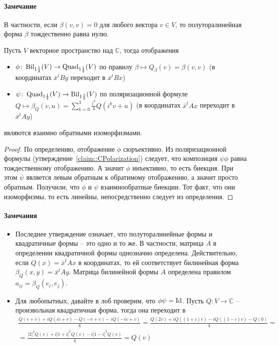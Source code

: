 \paragraph{Замечание}

В частности, если $\beta(v, v) = 0$ для любого вектора $v\in V$, то полуторалинейная форма $\beta$ тождественно равна нулю.

\begin{claim}\label{claim::CBilQuad}
Пусть $V$ векторное пространство над $\mathbb C$, тогда отображения
\begin{itemize}
\item $\phi\colon\operatorname{Bil}_{1\frac{1}{2}}(V)\to \operatorname{Quad}_{1\frac{1}{2}}(V)$ по правилу $\beta\mapsto Q_\beta(v) = \beta(v,v)$ (в координатах $\bar x^t B y$ переходит в $\bar x^t B x$)
\item $\psi\colon\operatorname{Quad}_{1\frac{1}{2}}(V)\to \operatorname{Bil}_{1\frac{1}{2}}(V)$ по поляризационной формуле $Q\mapsto \beta_Q(v,u) = \sum_{k=0}^3 \frac{i^k}{4}Q(i^k v + u)$ (в координатах $\bar x^t A x$ переходит в $\bar x^t A y$)
\end{itemize}
являются взаимно обратными изоморфизмами.
\end{claim}
\begin{proof}
По определению, отображение $\phi$ сюръективно. Из поляризационной формулы (утверждение~\ref{claim::CPolarization}) следует, что композиция $\psi\phi$ равна тождественному отображению. А значит $\phi$ инъективно, то есть биекция. При этом $\psi$ является левым обратным к обратимому отображению, а значит просто обратным. Получили, что $\phi$ и $\psi$ взаимнообратные биекции. Тот факт, что они изоморфизмы, то есть линейны, непосредственно следует из определения.
\end{proof}

\paragraph{Замечания}
\begin{itemize}
\item Последнее утверждение означает, что полуторалинейные формы и квадратичные формы -- это одно и то же. В частности, матрица $A$ в определении квадратичной формы однозначно определена. Действительно, если $Q(x) = \bar x^t A x$ в координатах, то ей соответствует билинейная форма $\beta_Q(x, y) = \bar x^t A y$. Матрица билинейной формы $A$ определена правилом $a_{ij} = \beta_Q(e_i, e_j)$.

\item Для любопытных, давайте в лоб проверим, что $\phi\psi = \operatorname{Id}$. Пусть $Q\colon V\to \mathbb C$ -- произвольная квадратичная форма, тогда она переходит в
\begin{gather*}
\frac{Q(v+v) + iQ(iv+v) - Q(-v+v) -i Q(-iv + v)}{4} = \frac{Q(2v) + iQ((1+i)v) - i Q((1-i)v) - Q(0)}{4} =\\ =\frac{|2|^2 Q(v)+i|1+i|^2Q(v) - i|1-i|^2Q(v)}{4} = Q(v)
\end{gather*}
\end{itemize}

